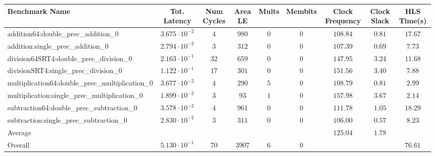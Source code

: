 \begin{tabular}{|l|c|c|c|c|c|c|c|c|}
\hline
Benchmark Name                                   & Tot. Latency            & Num Cycles & Area LE  & Mults & Membits & Clock Frequency & Clock Slack & HLS Time(s) \\
\hline
addition64:double\_prec\_addition\_0             & $ 3.675 \cdot 10^{-2} $ & $ 4      $ & $ 980  $ & $ 0 $ & $ 0   $ & $ 108.84      $ & $ 0.81    $ & $ 17.67   $ \\
addition:single\_prec\_addition\_0               & $ 2.794 \cdot 10^{-2} $ & $ 3      $ & $ 312  $ & $ 0 $ & $ 0   $ & $ 107.39      $ & $ 0.69    $ & $ 7.73    $ \\
division64SRT4:double\_prec\_division\_0         & $ 2.163 \cdot 10^{-1} $ & $ 32     $ & $ 659  $ & $ 0 $ & $ 0   $ & $ 147.95      $ & $ 3.24    $ & $ 11.68   $ \\
divisionSRT4:single\_prec\_division\_0           & $ 1.122 \cdot 10^{-1} $ & $ 17     $ & $ 301  $ & $ 0 $ & $ 0   $ & $ 151.56      $ & $ 3.40    $ & $ 7.88    $ \\
multiplication64:double\_prec\_multiplication\_0 & $ 3.677 \cdot 10^{-2} $ & $ 4      $ & $ 290  $ & $ 5 $ & $ 0   $ & $ 108.79      $ & $ 0.81    $ & $ 2.99    $ \\
multiplication:single\_prec\_multiplication\_0   & $ 1.899 \cdot 10^{-2} $ & $ 3      $ & $ 93   $ & $ 1 $ & $ 0   $ & $ 157.98      $ & $ 3.67    $ & $ 2.14    $ \\
subtraction64:double\_prec\_subtraction\_0       & $ 3.578 \cdot 10^{-2} $ & $ 4      $ & $ 961  $ & $ 0 $ & $ 0   $ & $ 111.78      $ & $ 1.05    $ & $ 18.29   $ \\
subtraction:single\_prec\_subtraction\_0         & $ 2.830 \cdot 10^{-2} $ & $ 3      $ & $ 311  $ & $ 0 $ & $ 0   $ & $ 106.00      $ & $ 0.57    $ & $ 8.23    $ \\
\hline
Average                                          & $                     $ & $        $ & $      $ & $   $ & $     $ & $ 125.04      $ & $ 1.78    $ & $         $ \\
\hline
Overall                                          & $ 5.130 \cdot 10^{-1} $ & $ 70     $ & $ 3907 $ & $ 6 $ & $ 0   $ & $             $ & $         $ & $ 76.61   $ \\
\hline
\end{tabular}
